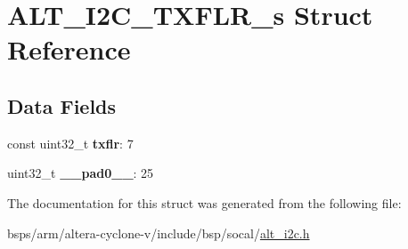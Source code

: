 \hypertarget{structALT__I2C__TXFLR__s}{}\section{A\+L\+T\+\_\+\+I2\+C\+\_\+\+T\+X\+F\+L\+R\+\_\+s Struct Reference}
\label{structALT__I2C__TXFLR__s}
\subsection*{Data Fields}
\begin{DoxyCompactItemize}
\item 
\mbox{\label{structALT__I2C__TXFLR__s_a878f986e959ac3192541b8dade0d5dbb}} 
const uint32\+\_\+t {\bfseries txflr}\+: 7
\item 
\mbox{\label{structALT__I2C__TXFLR__s_abbf96e29495f49212454cbc029975c3f}} 
uint32\+\_\+t {\bfseries \+\_\+\+\_\+pad0\+\_\+\+\_\+}\+: 25
\end{DoxyCompactItemize}


The documentation for this struct was generated from the following file\+:\begin{DoxyCompactItemize}
\item 
bsps/arm/altera-\/cyclone-\/v/include/bsp/socal/\mbox{\hyperlink{socal_2alt__i2c_8h}{alt\+\_\+i2c.\+h}}\end{DoxyCompactItemize}
